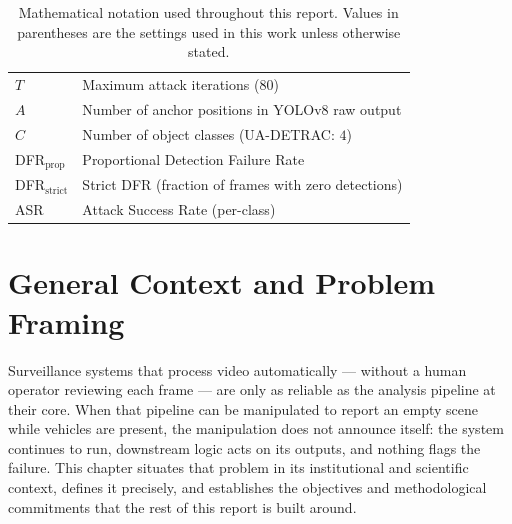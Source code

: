 \documentclass[12pt,a4paper]{report}
\begin{document}
\begin{table}[h!]
\begin{tabular}{@{}p{4.5cm}p{9.5cm}@{}}
    $T$                                            & Maximum attack iterations ($80$) \\
    $A$                                            & Number of anchor positions in YOLOv8 raw output \\
    $C$                                            & Number of object classes (UA-DETRAC: $4$) \\
    DFR$_\text{prop}$                              & Proportional Detection Failure Rate \\
    DFR$_\text{strict}$                            & Strict DFR (fraction of frames with zero detections) \\
    ASR                                            & Attack Success Rate (per-class) \\
    \bottomrule
  \end{tabular}
  \caption*{Mathematical notation used throughout this report.
            Values in parentheses are the settings used in this work
            unless otherwise stated.}
\end{table}

\clearpage
{}
\setcounter{page}{1}
\pagestyle{fancy}



\chapter{General Context and Problem Framing}
\label{ch:context}

Surveillance systems that process video automatically ---
without a human operator reviewing each frame --- are only
as reliable as the analysis pipeline at their core. When
that pipeline can be manipulated to report an empty scene
while vehicles are present, the manipulation does not
announce itself: the system continues to run, downstream
logic acts on its outputs, and nothing flags the failure.
This chapter situates that problem in its institutional and
scientific context, defines it precisely, and establishes
the objectives and methodological commitments that the rest
of this report is built around.
\end{document}
